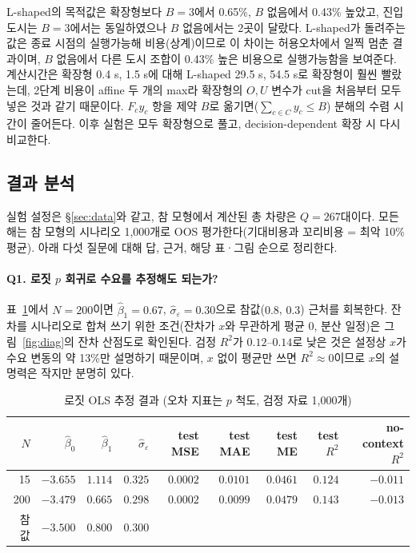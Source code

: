 \documentclass[10pt,a4paper]{article}
\begin{document}
L-shaped의 목적값은 확장형보다 $B=3$에서 0.65\%, $B$ 없음에서 0.43\% 높았고, 진입 도시는 $B=3$에서는 동일하였으나 $B$ 없음에서는 2곳이 달랐다. L-shaped가 돌려주는 값은 종료 시점의 실행가능해 비용(상계)이므로 이 차이는 허용오차에서 일찍 멈춘 결과이며, $B$ 없음에서 다른 도시 조합이 0.43\% 높은 비용으로 실행가능함을 보여준다. 계산시간은 확장형 0.4 s, 1.5 s에 대해 L-shaped 29.5 s, 54.5 s로 확장형이 훨씬 빨랐는데, 2단계 비용이 affine 두 개의 max라 확장형의 $O,U$ 변수가 cut을 처음부터 모두 넣은 것과 같기 때문이다. $F_c y_c$ 항을 제약 $B$로 옮기면($\sum_{c\in C}y_c\le B$) 분해의 수렴 시간이 줄어든다. 이후 실험은 모두 확장형으로 풀고, decision-dependent 확장 시 다시 비교한다.

\subsection{결과 분석}

실험 설정은 \S\ref{sec:data}와 같고, 참 모형에서 계산된 총 차량은 $Q=267$대이다. 모든 해는 참 모형의 시나리오 1{,}000개로 OOS 평가한다(기대비용과 꼬리비용 = 최악 10\% 평균). 아래 다섯 질문에 대해 답, 근거, 해당 표·그림 순으로 정리한다.

\paragraph{Q1. 로짓 $p$ 회귀로 수요를 추정해도 되는가?}
표~\ref{tab:fit}에서 $N=200$이면 $\hat\beta_1=0.67$, $\hat\sigma_\varepsilon=0.30$으로 참값($0.8$, $0.3$) 근처를 회복한다. 잔차를 시나리오로 합쳐 쓰기 위한 조건(잔차가 $x$와 무관하게 평균 0, 분산 일정)은 그림~\ref{fig:diag}의 잔차 산점도로 확인된다. 검정 $R^2$가 $0.12$--$0.14$로 낮은 것은 설정상 $x$가 수요 변동의 약 13\%만 설명하기 때문이며, $x$ 없이 평균만 쓰면 $R^2\approx0$이므로 $x$의 설명력은 작지만 분명히 있다.

\begin{table}[H]\centering\small
\caption{로짓 OLS 추정 결과 (오차 지표는 $p$ 척도, 검정 자료 1{,}000개)}\label{tab:fit}
\begin{tabular}{@{}rrrrrrrrr@{}}
\toprule
$N$ & $\hat\beta_0$ & $\hat\beta_1$ & $\hat\sigma_\varepsilon$ & test MSE & test MAE & test ME & test $R^2$ & no-context $R^2$ \\ \midrule
15  & $-3.655$ & $1.114$ & $0.325$ & $0.0002$ & $0.0101$ & $0.0461$ & $0.124$ & $-0.011$ \\
200 & $-3.479$ & $0.665$ & $0.298$ & $0.0002$ & $0.0099$ & $0.0479$ & $0.143$ & $-0.013$ \\
참값 & $-3.500$ & $0.800$ & $0.300$ & & & & & \\
\bottomrule
\end{tabular}
\end{table}
\end{document}
